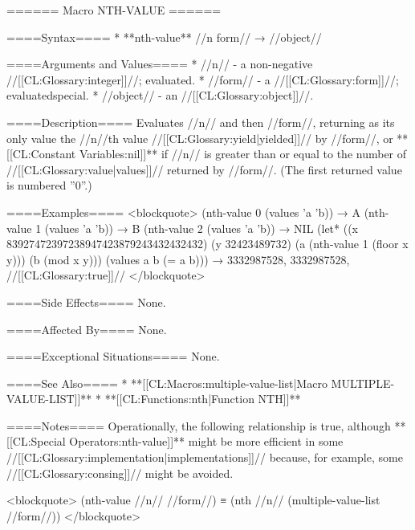 ====== Macro NTH-VALUE ======

====Syntax====
  * **nth-value** //n form// → //object//

====Arguments and Values====
  * //n// - a non-negative //[[CL:Glossary:integer]]//; evaluated.
  * //form// - a //[[CL:Glossary:form]]//; evaluatedspecial.
  * //object// - an //[[CL:Glossary:object]]//.

====Description====
Evaluates //n// and then //form//, returning as its only value the //n//th value //[[CL:Glossary:yield|yielded]]// by //form//, or **[[CL:Constant Variables:nil]]** if //n// is greater than or equal to the number of //[[CL:Glossary:value|values]]// returned by //form//. (The first returned value is numbered ''0''.)

====Examples====
<blockquote> (nth-value 0 (values 'a 'b)) → A (nth-value 1 (values 'a 'b)) → B (nth-value 2 (values 'a 'b)) → NIL (let* ((x 83927472397238947423879243432432432) (y 32423489732) (a (nth-value 1 (floor x y))) (b (mod x y))) (values a b (= a b))) → 3332987528, 3332987528, //[[CL:Glossary:true]]// </blockquote>

====Side Effects====
None.

====Affected By====
None.

====Exceptional Situations====
None.

====See Also====
  * **[[CL:Macros:multiple-value-list|Macro MULTIPLE-VALUE-LIST]]**
  * **[[CL:Functions:nth|Function NTH]]**

====Notes====
Operationally, the following relationship is true, although **[[CL:Special Operators:nth-value]]** might be more efficient in some //[[CL:Glossary:implementation|implementations]]// because, for example, some //[[CL:Glossary:consing]]// might be avoided.

<blockquote> (nth-value //n// //form//) ≡ (nth //n// (multiple-value-list //form//)) </blockquote>

